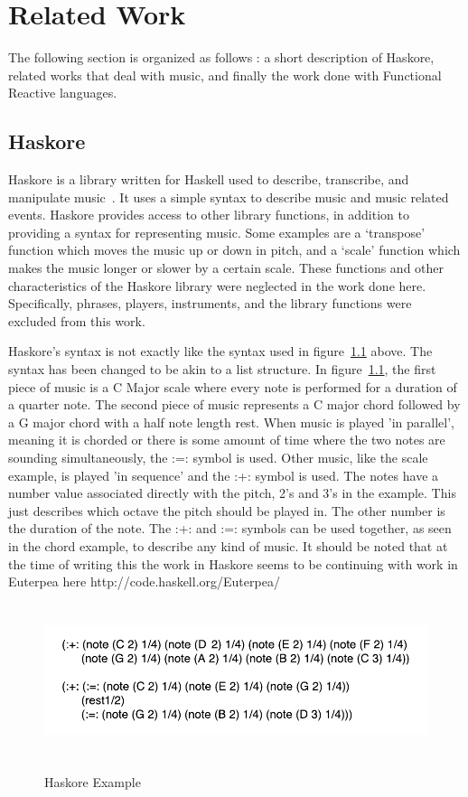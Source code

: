\documentclass[12pt]{ucthesis}
\newcommand{\captionfonts}{\small\bf\ssp}
\begin{document}
\chapter{Related Work}
\label{r	w}

The following section is organized as follows : a short description of Haskore, related works that deal with music, and finally the work done with Functional Reactive languages.

\section{Haskore}
\label{rw:haskore}

Haskore is a library written for Haskell used to describe, transcribe, and manipulate music~\cite{Haskore}. It uses a simple syntax to describe music and music related events. Haskore provides access to other library functions, in addition to providing a syntax for representing music. Some examples are a `transpose' function which moves the music up or down in pitch, and a `scale' function which makes the music longer or slower by a certain scale. These functions and other characteristics of the Haskore library were neglected in the work done here. Specifically, phrases, players, instruments, and the library functions were excluded from this work. 

Haskore's syntax is not exactly like the syntax used in figure~\ref{fig:haskore-example} above. The syntax has been changed to be akin to a list structure. In figure~\ref{fig:haskore-example}, the first piece of music is a C Major scale where every note is performed for a duration of a quarter note. The second piece of music represents a C major chord followed by a G major chord with a half note length rest. When music is played 'in parallel', meaning it is chorded or there is some amount of time where the two notes are sounding simultaneously, the :=: symbol is used. Other music, like the scale example, is played 'in sequence' and the :+: symbol is used. The notes have a number value associated directly with the pitch, 2's and 3's in the example. This just describes which octave the pitch should be played in. The other number is the duration of the note. The :+: and :=: symbols can be used together, as seen in the chord example, to describe any kind of music. It should be noted that at the time of writing this the work in Haskore seems to be continuing with work in Euterpea here http://code.haskell.org/Euterpea/

\begin{figure}
\includegraphics[height=45mm]{haskore-example.pdf}
\captionfonts
\caption[Haskore Example]{Haskore Example}
\label{fig:haskore-example}
\end{figure}
\end{document}
